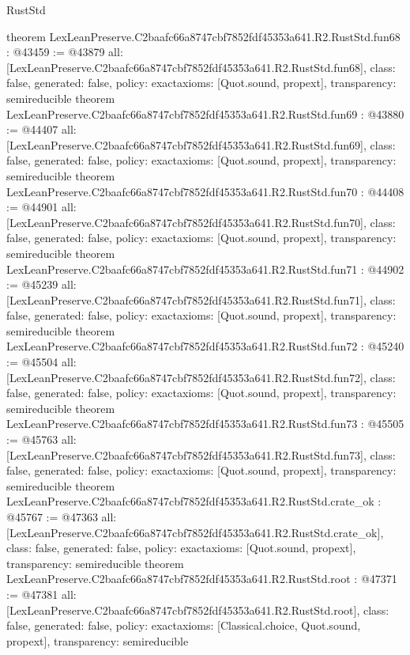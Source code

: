 \begin{lexlean}{RustStd}
\begin{coremodule}
{}
theorem LexLeanPreserve.C2baafc66a8747cbf7852fdf45353a641.R2.RustStd.fun68 : @43459 := @43879 {
  all: [LexLeanPreserve.C2baafc66a8747cbf7852fdf45353a641.R2.RustStd.fun68],
  class: false,
  generated: false,
  policy: exact{axioms: [Quot.sound, propext]},
  transparency: semireducible
}
theorem LexLeanPreserve.C2baafc66a8747cbf7852fdf45353a641.R2.RustStd.fun69 : @43880 := @44407 {
  all: [LexLeanPreserve.C2baafc66a8747cbf7852fdf45353a641.R2.RustStd.fun69],
  class: false,
  generated: false,
  policy: exact{axioms: [Quot.sound, propext]},
  transparency: semireducible
}
theorem LexLeanPreserve.C2baafc66a8747cbf7852fdf45353a641.R2.RustStd.fun70 : @44408 := @44901 {
  all: [LexLeanPreserve.C2baafc66a8747cbf7852fdf45353a641.R2.RustStd.fun70],
  class: false,
  generated: false,
  policy: exact{axioms: [Quot.sound, propext]},
  transparency: semireducible
}
theorem LexLeanPreserve.C2baafc66a8747cbf7852fdf45353a641.R2.RustStd.fun71 : @44902 := @45239 {
  all: [LexLeanPreserve.C2baafc66a8747cbf7852fdf45353a641.R2.RustStd.fun71],
  class: false,
  generated: false,
  policy: exact{axioms: [Quot.sound, propext]},
  transparency: semireducible
}
theorem LexLeanPreserve.C2baafc66a8747cbf7852fdf45353a641.R2.RustStd.fun72 : @45240 := @45504 {
  all: [LexLeanPreserve.C2baafc66a8747cbf7852fdf45353a641.R2.RustStd.fun72],
  class: false,
  generated: false,
  policy: exact{axioms: [Quot.sound, propext]},
  transparency: semireducible
}
theorem LexLeanPreserve.C2baafc66a8747cbf7852fdf45353a641.R2.RustStd.fun73 : @45505 := @45763 {
  all: [LexLeanPreserve.C2baafc66a8747cbf7852fdf45353a641.R2.RustStd.fun73],
  class: false,
  generated: false,
  policy: exact{axioms: [Quot.sound, propext]},
  transparency: semireducible
}
theorem LexLeanPreserve.C2baafc66a8747cbf7852fdf45353a641.R2.RustStd.crate_ok : @45767 := @47363 {
  all: [LexLeanPreserve.C2baafc66a8747cbf7852fdf45353a641.R2.RustStd.crate_ok],
  class: false,
  generated: false,
  policy: exact{axioms: [Quot.sound, propext]},
  transparency: semireducible
}
theorem LexLeanPreserve.C2baafc66a8747cbf7852fdf45353a641.R2.RustStd.root : @47371 := @47381 {
  all: [LexLeanPreserve.C2baafc66a8747cbf7852fdf45353a641.R2.RustStd.root],
  class: false,
  generated: false,
  policy: exact{axioms: [Classical.choice, Quot.sound, propext]},
  transparency: semireducible
}


\end{coremodule}
\end{lexlean}
